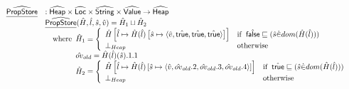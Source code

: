 \documentclass{article}
\newcommand{\SF}[1]{\mbox{\textsf{#1}}}
\newcommand{\wherec}[1]{{\rm where}\begin{array}[t]{l}#1\end{array}}
\newcommand{\ifc}[1]{{\rm if}\begin{array}[t]{l}#1\end{array}}
\newcommand{\owc}{{\rm otherwise}}
\newcommand{\abs}[1]{\widehat{\SF{#1}}}
\newcommand{\aHeap}{\abs{Heap}}
\newcommand{\aLoc}{\abs{Loc}}
\newcommand{\aValue}{\abs{Value}}
\newcommand{\set}[1]{\left\{\begin{array}{l}#1\end{array}\right\}}
\newcommand{\ahf}[1]{\widehat{\underline{\sf #1}}}
\newcommand{\rwith}{~{\sf with}~}
\newcommand{\atrue}{\hat{\SF{true}}}
\newcommand{\afalse}{\hat{\SF{false}}}
\begin{document}
\[\begin{array}{ll}
\ahf{PropStore} & : \aHeap \times \aLoc \times \abs{String} \times \aValue \rightarrow \aHeap \\
& \ahf{PropStore}(\hat{H},\hat{l},\hat{s},\hat{v})
  = \hat{H}_1\sqcup\hat{H}_2\\
& \quad\wherec{
\hat{H}_1 = \left\{
    \begin{array}{ll}
      \hat{H}\left[\hat{l}\mapsto \hat{H}(\hat{l})\left[\hat{s}\mapsto \langle\hat{v},\atrue,\atrue,\atrue\rangle\right]\right] & \ifc{\afalse\sqsubseteq(\hat{s} \dot{\in} dom(\hat{H}(\hat{l})))} \\
      \bot_{Heap} & \owc \\
    \end{array}
  \right. \\
  \hat{ov}_{old}=\hat{H}(\hat{l})(\hat{s}).1.1\\
  \hat{H}_2 = \left\{
    \begin{array}{ll}
      \hat{H}\left[\hat{l}\mapsto \hat{H}(\hat{l})\left[\hat{s}\mapsto
          \langle \hat{v},\hat{ov}_{old}.2,\hat{ov}_{old}.3,\hat{ov}_{old}.4\rangle
        \right]\right] & \ifc{\atrue\sqsubseteq (\hat{s} \dot{\in} dom(\hat{H}(\hat{l})))}\\
      \bot_{Heap} & \owc \\
    \end{array}
  \right. \\
}\\
\\



\end{array}\]
\end{document}
